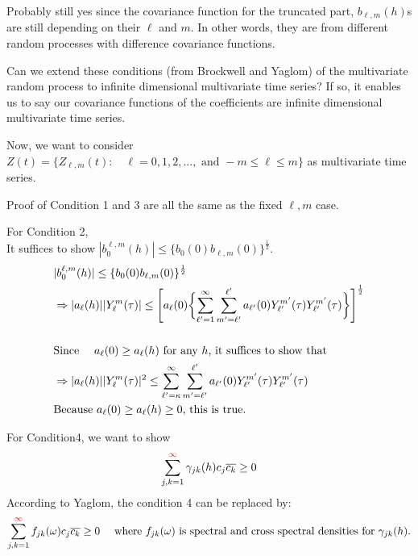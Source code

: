 \documentclass[11pt]{article}
\begin{document}
\begin{itemize}
{\item
Probably still yes since the covariance function for the truncated part, $b_{\ell,m}(h)$s are still depending on their $\ell$ and $m$. In other words, they are from different random processes with difference covariance functions.\\

\item 
Can we extend these conditions (from Brockwell and Yaglom) of the multivariate random process to infinite dimensional multivariate time series? If so, it enables us to say our covariance functions of the coefficients are infinite dimensional multivariate time series.\\
}

\pagebreak

\item
Now, we want to consider $Z(t) = \{Z_{\ell,m}(t): \quad \ell=0,1,2,..., \text{ and } -m \le \ell \le m \}$ as multivariate time series.\\

\item
Proof of Condition 1 and 3 are all the same as the fixed $\ell,m$ case.\\

\item
For Condition 2,\\
It suffices to show $|b_{0}^{\ell,m}(h)| \le \{b_{0}(0) b_{\ell,m}(0)\}^\frac{1}{2}$.\\
\begin{align*}
&|b_{0}^{\ell,m}(h)| \le \{b_{0}(0) b_{\ell,m}(0)\}^\frac{1}{2}\\
&\Rightarrow |a_{\ell}(h)||Y_{\ell}^{m}(\tau)| \le \Biggl[ a_{\ell}(0) \biggl\{ \sum_{{\ell}'=1}^{\infty} \sum_{m'=\ell'}^{\ell'} a_{{\ell}'}(0) Y_{{\ell}'}^{{m}'}(\tau) Y_{{\ell}'}^{{m}'}(\tau) \biggl\} \Biggl]^\frac{1}{2}\\
\\
&\text{Since \quad $a_{\ell}(0) \ge a_{\ell}(h)$ for any $h$, it suffices to show that }\\
&\Rightarrow |a_{\ell}(h)||Y_{\ell}^{m}(\tau)|^2 \le \sum_{{\ell}'=\kappa}^{\infty} \sum_{m'=\ell'}^{\ell'} a_{{\ell}'}(0) Y_{{\ell}'}^{{m}'}(\tau) Y_{{\ell}'}^{{m}'}(\tau)\\
&\text{Because $a_\ell(0) \ge a_\ell(h)  \ge 0$, this is true.}\\
\end{align*}

\item
For Condition4, we want to show\\
$$\sum_{j,k=1}^{{\color{red}\infty}} \gamma_{jk}(h) c_j \overline{c_k} \ge 0$$
According to Yaglom, the condition 4 can be replaced by:\\
$$\sum_{j,k=1}^{{\color{red}\infty}} f_{jk}(\omega) c_j \overline{c_k} \ge 0 \quad \text{ where } f_{jk}(\omega) \text{ is spectral and cross spectral densities for } \gamma_{jk}(h).$$


\end{itemize}
\end{document}
